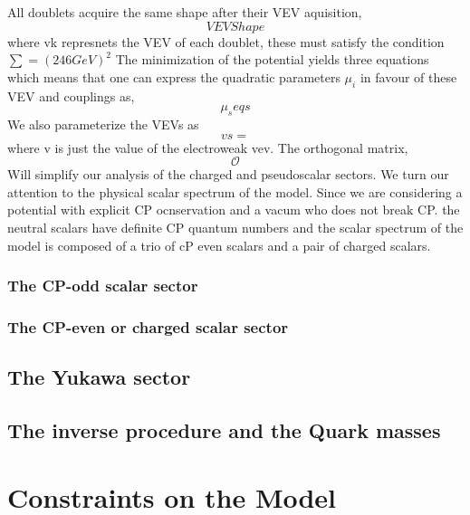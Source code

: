All doublets acquire the same shape after their  VEV aquisition, 
\begin{equation}
VEV Shape 
\end{equation}
where vk represnets the VEV of each doublet, these must satisfy the condition $\sum = (246 GeV)^2$ The minimization of the potential yields three equations which means that one can express the quadratic parameters  $\mu_i$ in favour of these VEV and couplings as, 
%
\begin{equation}
\mu_s eqs 
\end{equation}
%
We also parameterize the VEVs as
%
\begin{equation}
vs = 
\end{equation}
%
where v is just the value of the electroweak vev. The orthogonal matrix, 
%
\begin{equation}
\mathcal{O}
\end{equation}
%
Will simplify our analysis of the charged and pseudoscalar sectors. We turn our attention to the physical scalar spectrum of the model. Since we are considering a potential with explicit CP ocnservation and a vacum who does not break CP. the neutral scalars have definite CP quantum numbers and the scalar spectrum of the model is composed of a trio of cP even scalars and a pair of charged scalars. 

\subsubsection{The CP-odd scalar sector}

\subsubsection{The CP-even or charged scalar sector}

\subsection{The Yukawa sector}

\subsection{The inverse procedure and the Quark masses}

\section{Constraints on the Model}

